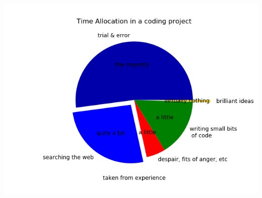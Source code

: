 
\begin{frame}
%
\begin{tcolorbox}[title=Output: Advanced Pie Plot]
\begin{center}
	\includegraphics[width=.65\linewidth]{./gfx/plt-pie-args}
\end{center}
\end{tcolorbox}
%
\end{frame}


